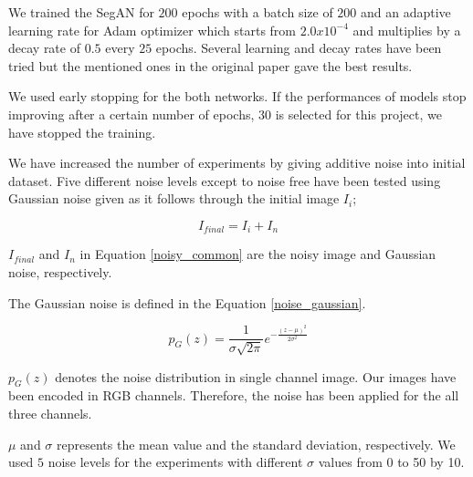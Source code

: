     We trained the SegAN for $200$ epochs with a batch size of $200$ and an adaptive learning rate for Adam optimizer
    which starts from $2.0 x 10^{-4}$ and multiplies by a decay rate of $0.5$ every $25$ epochs.
    Several learning and decay rates have been tried but the mentioned ones in the original paper gave the best results.

    We used early stopping for the both networks.
    If the performances of models stop improving after a certain number of epochs, $30$ is selected for this project, we have stopped the training.

    We have increased the number of experiments by giving additive noise into initial dataset.
    Five different noise levels except to noise free have been tested using Gaussian noise given as it follows through the
    initial image $I_i$;

    \begin{equation}
        I_{final} = I_i + I_n \label{noisy_common}
    \end{equation}

    $I_{final}$ and $I_{n}$ in Equation \eqref{noisy_common} are the noisy image and Gaussian noise, respectively.

    The Gaussian noise is defined in the Equation  \eqref{noise_gaussian}.

    \begin{equation}
        p_G(z) = \frac{1}{\sigma\sqrt{2\pi}} e^{ -\frac{(z-\mu)^2}{2\sigma^2} }  \label{noise_gaussian}
    \end{equation}

    $p_G(z)$ denotes the noise distribution in single channel image.
    Our images have been encoded in RGB channels. Therefore, the noise has been applied for the all three channels.

    $\mu$ and $\sigma$ represents the mean value and the standard deviation, respectively.
    We used $5$ noise levels for the experiments with different $\sigma$ values from 0 to 50 by 10.